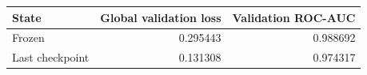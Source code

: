 \begin{tabular}{lrr}
\toprule
State & Global validation loss & Validation ROC-AUC \\
\midrule
Frozen & 0.295443 & 0.988692 \\
Last checkpoint & 0.131308 & 0.974317 \\
\bottomrule
\end{tabular}
